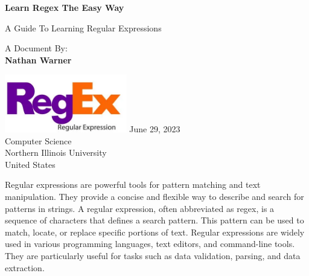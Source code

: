 \documentclass{report}
\title{\Huge{}}
\author{\huge{Nathan Warner}}
\date{\huge{}}
\begin{document}
        \begin{titlepage}
       \begin{center}
           \vspace*{1cm}
    
           \textbf{Learn Regex The Easy Way}
    
           \vspace{0.5cm}
           A Guide To Learning Regular Expressions
            
                
           \vspace{1.5cm}
    
           A Document By: \\
           \textbf{Nathan Warner}
    
           \vfill
                
                
           \vspace{0.8cm}
         
           \includegraphics[width=0.4\textwidth]{./figures/RegEx-Logo.png}
           \bigbreak \noindent 
            June 29, 2023 \\ 
           Computer Science \\
           Northern Illinois University\\
           United States\\
           
                
       \end{center}
    \end{titlepage}
    \tableofcontents
    \pagebreak \bigbreak \noindent
    Regular expressions are powerful tools for pattern matching and text manipulation. They provide a concise and flexible way to describe and search for patterns in strings.
    \bigbreak \noindent 
    A regular expression, often abbreviated as regex, is a sequence of characters that defines a search pattern. This pattern can be used to match, locate, or replace specific portions of text.
    \bigbreak \noindent 
    Regular expressions are widely used in various programming languages, text editors, and command-line tools. They are particularly useful for tasks such as data validation, parsing, and data extraction.
\end{document}

